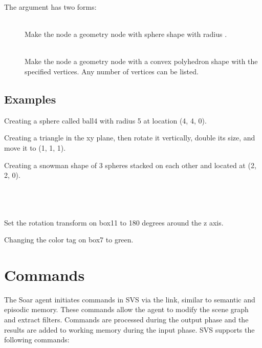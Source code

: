 The  argument has two forms:

\begin{description}
	\item[] \hfill \\
		Make the node a geometry node with sphere shape with radius .
	\item[] \hfill \\
		Make the node a geometry node with a convex polyhedron shape with the specified vertices.
		Any number of vertices can be listed.
\end{description}


\subsection{Examples}

Creating a sphere called ball4 with radius 5 at location (4, 4, 0). \\

Creating a triangle in the xy plane, then rotate it vertically, double its size, and move it to (1, 1, 1).  \\

Creating a snowman shape of 3 spheres stacked on each other and located at (2, 2, 0). \\
 \\
 \\
 \\

Set the rotation transform on box11 to 180 degrees around the z axis. \\

Changing the color tag on box7 to green. \\


\section{Commands}

The Soar agent initiates commands in SVS via the  link, 
similar to semantic and episodic memory. These commands allow the agent to 
modify the scene graph and extract filters. 
Commands are processed during the output phase and the results are added to 
working memory during the input phase. 
SVS supports the following commands:

